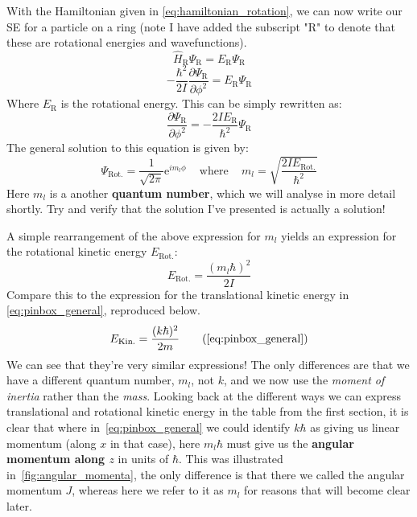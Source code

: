 \documentclass{memoir}[11pt,oneside,a4paper,openany]
\newcommand{\wf}{\ensuremath{\Psi}\xspace}
\begin{document}
With the Hamiltonian given in \autoref{eq:hamiltonian_rotation}, we can now write our SE for a particle on a ring (note I have added the subscript "R" to denote that these are rotational energies and wavefunctions).
\begin{equation}
	\hat{H}_{\text{R}} \wf_{\text{R}} = E_{\text{R}} \wf_{\text{R}}
\end{equation}
\begin{equation}
	-\frac{\hbar^2}{2I}\frac{\partial \wf_{\text{R}}}{\partial\phi^2} = E_{\text{R}} \wf_{\text{R}}
\end{equation}
Where $E_{\text{R}}$ is the rotational energy. This can be simply rewritten as: 
\begin{equation}
	\frac{\partial \wf_{\text{R}}}{\partial\phi^2} = -\frac{2IE_{\text{R}}}{\hbar^2}\wf_{\text{R}}
\end{equation}
The general solution to this equation is given by:
\begin{equation}\label{eq:rotational_general_solution}
	\wf_{\text{Rot.}} = \frac{1}{\sqrt{2\pi}}\mathrm{e}^{im_l\phi}\,\quad\text{where}\quad\,m_l=\sqrt{\frac{2IE_{\text{Rot.}}}{\hbar^2}}
\end{equation}
Here $m_l$ is a another \textbf{quantum number}, which we will analyse in more detail shortly. Try and verify that the solution I've presented is actually a solution!

A simple rearrangement of the above expression for $m_l$ yields an expression for the rotational kinetic energy $E_{\text{Rot.}}$:
\begin{equation}
	E_{\text{Rot.}} = \frac{(m_l \hbar)^2}{2I}
\end{equation}
Compare this to the expression for the translational kinetic energy in \autoref{eq:pinbox_general}, reproduced below.
\begin{equation*}
	E_{\text{Kin.}} = \frac{(k\hbar)^2}{2m} \tag{\ref{eq:pinbox_general}}
\end{equation*}
We can see that they're very similar expressions! The only differences are that we have a different quantum number, $m_l$, not $k$, and we now use the \emph{moment of inertia} rather than the \emph{mass}. Looking back at the different ways we can express translational and rotational kinetic energy in the table from the first section, it is clear that where in~\autoref{eq:pinbox_general} we could identify $k\hbar$ as giving us linear momentum (along $x$ in that case), here $m_l\hbar$ must give us the \textbf{angular momentum along $z$} in units of $\hbar$. This was illustrated in~\autoref{fig:angular_momenta}, the only difference is that there we called the angular momentum $J$, whereas here we refer to it as $m_l$ for reasons that will become clear later.   
\end{document}
